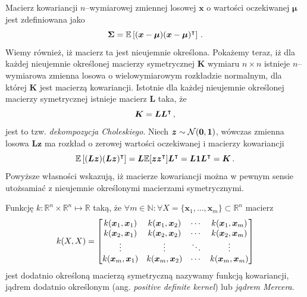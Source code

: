 \documentclass{myclass}
\begin{document}
Macierz kowariancji \(n\)--wymiarowej zmiennej losowej \(\bm{x}\) o wartości oczekiwanej
\(\bm{\mu}\) jest zdefiniowana jako
\[
\bm{\Sigma} = \mathbb{E}\left[(\bm{x} - \bm{\mu})(\bm{x} - \bm{\mu})^\intercal\right]\,.
\]
Wiemy również, iż macierz ta jest nieujemnie określona. Pokażemy teraz, iż dla każdej nieujemnie
określonej macierzy symetrycznej \(\bm{K}\) wymiaru \(n\times n\) istnieje \(n\)--wymiarowa zmienna
losowa o wielowymiarowym rozkładzie normalnym, dla której \(\bm{K}\) jest macierzą kowariancji.
Istotnie dla każdej nieujemnie określonej macierzy symetrycznej istnieje macierz \(\bm{L}\) taka, że
\[
\bm{K} = \bm{L}\bm{L}^\intercal\,,
\]
jest to tzw. \emph{dekompozycja Choleskiego}. Niech \(\bm{z} \sim \mathcal{N}(\bm{0}, \bm{1})\), wówczas
zmienna losowa \(\bm{L}\bm{z}\) ma rozkład o zerowej wartości oczekiwanej i macierzy kowariancji
\[
\mathbb{E}\left[(\bm{L}\bm{z})(\bm{L}\bm{z})^\intercal\right] = \bm{L}\mathbb{E}[\bm{z}\bm{z}^\intercal]\bm{L}^\intercal = \bm{L}\bm{1}\bm{L}^\intercal = \bm{K}\,.
\]
Powyższe własności wskazują, iż macierze kowariancji można w pewnym sensie utożsamiać z nieujemnie
określonymi macierzami symetrycznymi.

Funkcję \(k: \mathbb{R}^n\times\mathbb{R}^n\mapsto\mathbb{R}\) taką, że \(\forall m\in\mathbb{N} :
\forall X = \{\bm{x}_1,\ldots,\bm{x}_m\} \subset \mathbb{R}^n\) macierz
\[
k(X,X) = \mqty[k(\bm{x}_1, \bm{x}_1) & k(\bm{x}_1, \bm{x}_2) & \cdots & k(\bm{x}_1, \bm{x}_m)\\
k(\bm{x}_2, \bm{x}_1) & k(\bm{x}_2, \bm{x}_2) & \cdots & k(\bm{x}_2, \bm{x}_m)\\
\vdots & \vdots & \ddots & \vdots\\
k(\bm{x}_m, \bm{x}_1) & k(\bm{x}_m, \bm{x}_2) & \cdots & k(\bm{x}_m, \bm{x}_m)\\]
\]
jest dodatnio określoną macierzą symetryczną nazywamy funkcją kowariancji, jądrem dodatnio
określonym (ang. \emph{positive definite kernel}) lub \emph{jądrem Mercera}.
\end{document}
